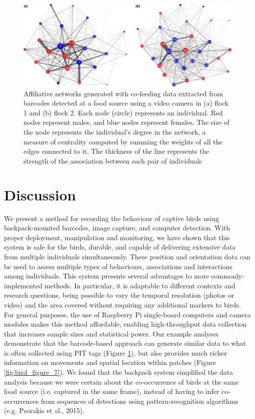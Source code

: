 \documentclass[11pt,a4paper,twoside]{book}
\begin{document}
\begin{doublespace}
\begin{figure}[!htb]
    \centering
    \includegraphics{Graving_IMPRS_Thesis/figures/bird_figure_8.jpg}
    \caption{Affiliative networks generated with co‐feeding data extracted from barcodes detected at a food source using a video camera in (a) flock 1 and (b) flock 2. Each node (circle) represents an individual. Red nodes represent males, and blue nodes represent females. The size of the node represents the individual's degree in the network, a measure of centrality computed by summing the weights of all the edges connected to it. The thickness of the line represents the strength of the association between each pair of individuals
}
    \label{fig:bird_figure_8}
\end{figure}

\section{Discussion}
We present a method for recording the behaviour of captive birds using backpack‐mounted barcodes, image capture, and computer detection. With proper deployment, manipulation and monitoring, we have shown that this system is safe for the birds, durable, and capable of delivering extensive data from multiple individuals simultaneously. These position and orientation data can be used to assess multiple types of behaviours, associations and interactions among individuals. This system presents several advantages to more commonly‐implemented methods. In particular, it is adaptable to different contexts and research questions, being possible to vary the temporal resolution (photos or video) and the area covered without requiring any additional markers to birds. For general purposes, the use of Raspberry Pi single‐board computers and camera modules makes this method affordable, enabling high‐throughput data collection that increases sample sizes and statistical power. Our example analyses demonstrate that the barcode‐based approach can generate similar data to what is often collected using PIT tags (Figure \ref{fig:bird_figure_8}), but also provides much richer information on movements and spatial location within patches (Figure \ref{fig:bird_figure_7}). We found that the backpack system simplified the data analysis because we were certain about the co‐occurrence of birds at the same food source (i.e. captured in the same frame), instead of having to infer co‐occurrences from sequences of detections using pattern‐recognition algorithms (e.g. Psorakis et al., 2015).


\end{doublespace}
\end{document}
